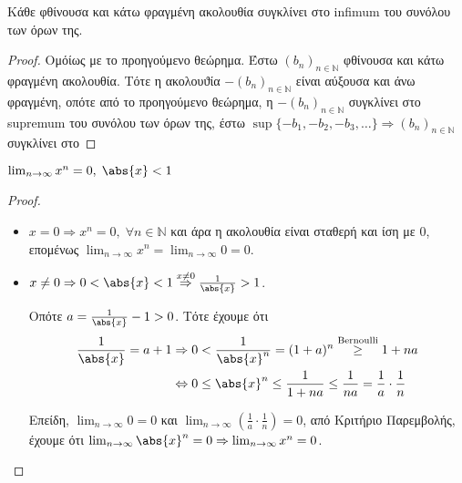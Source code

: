 \documentclass[main.tex]{subfiles}
\begin{document}
\begin{thm}
    Κάθε φθίνουσα και κάτω φραγμένη ακολουθία συγκλίνει στο infimum του 
    συνόλου των όρων της.
\end{thm}

\begin{proof}
    Ομόίως με το προηγούμενο θεώρημα. Έστω 
    $ (b_{n})_{n \in \mathbb{N}} $ 
    φθίνουσα και κάτω φραγμένη ακολουθία. Τότε η ακολουϑία 
    $ -(b_{n})_{n \in \mathbb{N}} $ είναι αύξουσα και άνω φραγμένη, 
    οπότε από το προηγούμενο θεώρημα, η $ -(b_{n})_{n \in \mathbb{N}} $
    συγκλίνει στο supremum του συνόλου των όρων της, έστω 
    $ \sup \{ - b_{1}, - b_{2}, -b_{3}, \ldots \}
    \Rightarrow (b_{n})_{n \in \mathbb{N}} $ συγκλίνει στο  
\end{proof}

\begin{prop}
    $ \lim_{n \to \infty} x^{n} = 0, \; \abs{x} <1  $
\end{prop}

\begin{proof}
\item {}
    \begin{itemize}
        \item $ x = 0 \Rightarrow x^{n} = 0, \; \forall n \in 
            \mathbb{N} $ και άρα η ακολουθία είναι σταθερή και ίση με 
            0, επομένως 
            $ \lim_{n \to \infty} x^{n} = \lim_{n \to \infty} 0 = 0 $.

        \item $ x \neq 0 \Rightarrow 0 < \abs{x} < 1 
            \overset{x \neq 0}{\Rightarrow} \frac{1}{\abs{x}} > 1  $. 

            Οπότε $ a = \frac{1}{\abs{x}} - 1 > 0 $. Τότε έχουμε ότι 
            \begin{align*} 
                \frac{1}{\abs{x}} = a+1 
                    &\Rightarrow 0< \frac{1}{\abs{x}^{n}}  = (1+a)^{n}
                    \overset{\text{Bernoulli}}{\geq} 1 + na \\ 
                    & \Leftrightarrow 0 \leq \abs{x}^{n} \leq 
                    \frac{1}{1+na} \leq \frac{1}{na} = \frac{1}{a} 
                    \cdot \frac{1}{n} 
            \end{align*} 

            Επείδη, $ \lim_{n \to \infty} 0 = 0 $ και 
            $ \lim_{n \to \infty} \left(\frac{1}{a} \cdot \frac{1}{n} 
            \right) = 0$, από Κριτήριο Παρεμβολής, έχουμε ότι 
            $ \lim_{n \to \infty} \abs{x} ^{n} = 
            0 \Rightarrow \lim_{n \to \infty}x^{n} = 0$.
    \end{itemize}
\end{proof}
\end{document}
